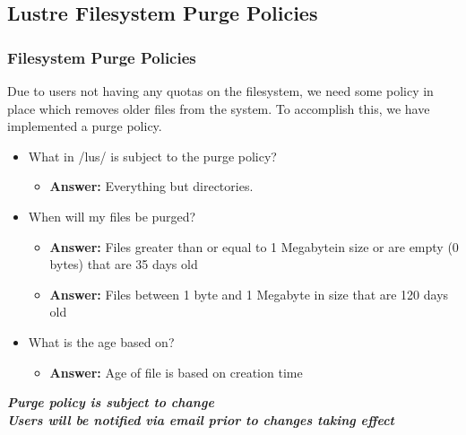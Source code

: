\subsection{Lustre Filesystem Purge Policies}
\begin{frame}
\frametitle{{\lustre} Filesystem Purge Policies}
Due to users not having any quotas on the {\lustre} filesystem, we need some policy in place which removes older files from the system.  To accomplish this, we have implemented a purge policy.

\begin{itemize}
\item What in \ctilde/lus/ is subject to the purge policy?
   \begin{itemize}
   \item \textbf{Answer:} Everything but directories.
   \end{itemize}
\item When will my files be purged?
  \begin{itemize}  
    \item \textbf{Answer:} Files greater than or equal to 1 Megabytein size  or are empty (0 bytes) that are 35 days old
    \item \textbf{Answer:} Files between 1 byte and 1 Megabyte in size that are 120 days old
  \end{itemize}
\item What is the age based on?
   \begin{itemize}
   \item \textbf{Answer:} Age of file is based on creation time
   \end{itemize}
   
\end{itemize}
\btVFill
\begin{center}
\footnotesize \textbf{\emph{Purge policy is subject to change~\\Users will be notified via email prior to changes taking effect}}
\end{center}
\end{frame}




